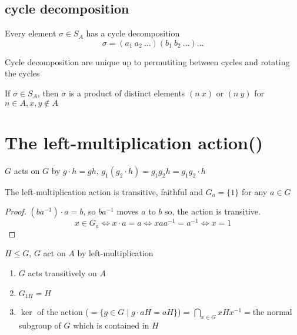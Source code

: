 \subsection{cycle decomposition}

\begin{example}
  Every element $\sigma \in S_A$ has a cycle decomposition
  \[\sigma = (a_1\ a_2\ \dotsc)(b_1\ b_2\ \dotsc)\dotsc\]
\end{example}

\begin{theorem}
  Cycle decomposition are unique up to  permutiting between cycles and rotating the cycles
\end{theorem}

\begin{theorem}
  If $\sigma \in S_A$, then $\sigma$ is a product of distinct elements $(n\ x)$ or $(n\ y)$ for $n \in A, x,y \notin A$
\end{theorem}

\section{The left-multiplication action()}
$G$ acts on $G$ by $g\cdot h = gh$, $g_1(g_2\cdot h) = g_1g_2h = g_1g_2\cdot h$

\begin{observation}
  The left-multiplication action is transitive, faithful and $G_a = \{1\}$ for any $a \in G$
\end{observation}

\begin{proof}
  $(ba^{-1})\cdot a = b$, so $ba^{-1}$ moves $a$ to $b$ so, the action is transitive.
  $$x \in G_a \iff x \cdot a = a \iff x a a^{-1} = a^{-1} \iff x = 1$$
\end{proof}

\begin{theorem}
  $H \le G$, $G$ act on $A$ by left-multiplication
  \begin{enumerate}
    \item $G$ acts transitively on $A$
    \item $G_{1H} = H$
    \item $\ker$ of the action ($= \{g \in G \mid g \cdot aH = aH\}$) 
    = $\bigcap_{x \in G}xHx^{-1} = $the normal subgroup of $G$ which is contained in $H$
  \end{enumerate}
\end{theorem}

